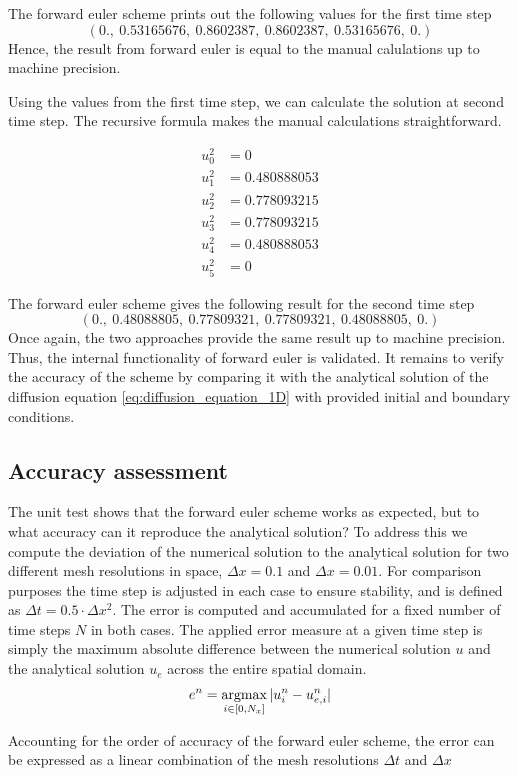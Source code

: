 \documentclass[12pt]{extarticle}
\begin{document}
The forward euler scheme prints out the following values for the first time step
\[ (0.,\:         0.53165676,\: 0.8602387,\:  0.8602387,\:  0.53165676,\: 0.        ) \]
Hence, the result from forward euler is equal to the manual calulations up to machine precision.

\par Using the values from the first time step, we can calculate the solution at second time step. The recursive formula makes the manual calculations straightforward.

\begin{align*}
	u_0^2 &= 0 \\
	u_1^2 &= 0.480888053 \\
	u_2^2 &= 0.778093215 \\
	u_3^2 &= 0.778093215 \\
	u_4^2 &= 0.480888053 \\
	u_5^2 &= 0
\end{align*}

The forward euler scheme gives the following result for the second time step
\[ (0.,\:         0.48088805,\: 0.77809321,\: 0.77809321,\: 0.48088805,\: 0.        ) \]
Once again, the two approaches provide the same result up to machine precision. Thus, the internal functionality of forward euler is validated. It remains to verify the accuracy of the scheme by comparing it with the analytical solution of the diffusion equation \ref{eq:diffusion_equation_1D} with provided initial and boundary conditions.

\subsection*{Accuracy assessment}
The unit test shows that the forward euler scheme works as expected, but to what accuracy can it reproduce the analytical solution? To address this we compute the deviation of the numerical solution to the analytical solution for two different mesh resolutions in space, $\Delta x=0.1$ and $\Delta x = 0.01$. For comparison purposes the time step is adjusted in each case to ensure stability, and is defined as $\Delta t = 0.5\cdot \Delta x^2$. The error is computed and accumulated for a fixed number of time steps $N$ in both cases. The applied error measure at a given time step is simply the maximum absolute difference between the numerical solution $u$ and the analytical solution $u_e$ across the entire spatial domain.
\[ e^n = \operatorname*{argmax}_{i \in [0,N_x]} |u_i^n - u_{e,i}^n| \]

Accounting for the order of accuracy of the forward euler scheme, the error can be expressed as a linear combination of the mesh resolutions $\Delta t$ and $\Delta x$ \cite{Linge2017}
\end{document}
